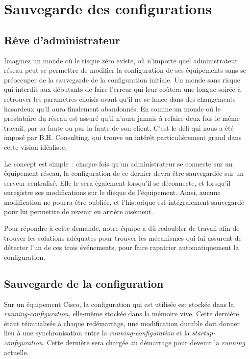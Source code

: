 \section{Sauvegarde des configurations}
\subsection{Rêve d'administrateur}

Imaginez un monde où le risque zéro existe, où n'importe quel administrateur réseau peut se permettre de modifier la configuration de ses équipements sans se préoccuper de la sauvegarde de la configuration initiale. Un monde sans risque qui interdit aux débutants de faire l'erreur qui leur coûtera une longue soirée à retrouver les paramètres choisis avant qu'il ne se lance dans des changements hasardeux qu'il aura finalement abandonnés. En somme un monde où le prestataire du réseau est assuré qu'il n'aura jamais à refaire deux fois le même travail, par sa faute ou par la faute de son client. C'est le défi qui nous a été imposé par B.H. Consulting, qui trouve un intérêt particulièrement grand dans cette vision idéaliste.

Le concept est simple~: chaque fois qu'un administrateur se connecte sur un équipement réseau, la configuration de ce dernier devra être sauvegardée sur un serveur centralisé. Elle le sera également lorsqu'il se déconnecte, et lorsqu'il enregistre ses modifications sur le disque de l'équipement. Ainsi, aucune modification ne pourra être oubliée, et l'historique est intégralement sauvegardé pour lui permettre de revenir en arrière aisément.

Pour répondre à cette demande, notre équipe a dû redoubler de travail afin de trouver les solutions adéquates pour trouver les mécanismes qui lui assurent de détecter l'un de ces trois événements, pour faire rapatrier automatiquement la configuration.

\subsection{Sauvegarde de la configuration}

Sur un équipement Cisco, la configuration qui est utilisée est stockée dans la \emph{running-configuration}, elle-même stockée dans la mémoire vive. Cette dernière étant réinitialisée à chaque redémarrage, une modification durable doit donner lieu à une synchronisation entre la \emph{running-configuration} et la \emph{startup-configuration}. Cette dernière sera chargée au démarrage pour devenir la \emph{running} actuelle. 

